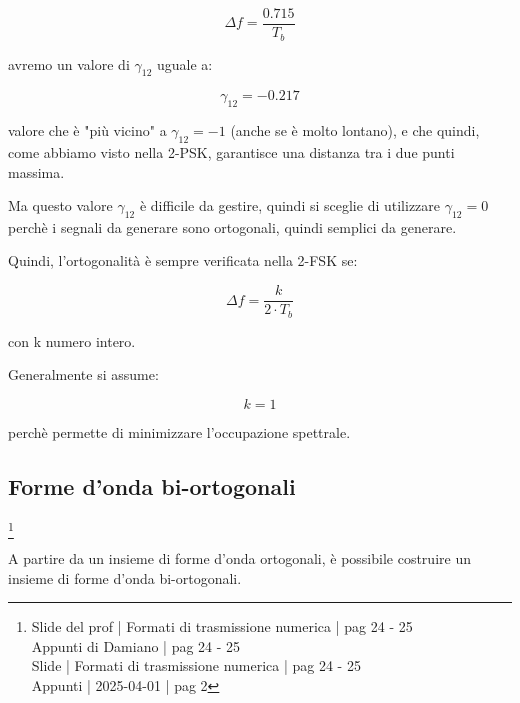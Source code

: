 {
    \Large 
    \begin{equation}
        \Delta f = 
        \frac{0.715}{T_b} 
    \end{equation}
}

avremo un valore di $\gamma_{12}$ uguale a: 

{
    \Large 
    \begin{equation}
        \gamma_{12} = -0.217
    \end{equation}
}

valore che è "più vicino" a $\gamma_{12} = -1$ (anche se è molto lontano), 
e che quindi, come abbiamo visto nella 2-PSK, garantisce una distanza tra i due punti massima. \newline 

Ma questo valore $\gamma_{12}$ è difficile da gestire, quindi si sceglie di utilizzare $\gamma_{12} = 0$ 
perchè i segnali da generare sono ortogonali, quindi semplici da generare. \newline 

Quindi, l'ortogonalità è sempre verificata nella 2-FSK se: 

{
    \Large 
    \begin{equation}
        \Delta f = \frac{k}{2 \cdot T_b}
    \end{equation}
}

con k numero intero. \newline 

Generalmente si assume: 

{
    \Large 
    \begin{equation}
        k = 1
    \end{equation}
}

perchè permette di minimizzare l'occupazione spettrale. \newline 

\newpage 

\subsection{Forme d'onda bi-ortogonali}
\footnote{Slide del prof | Formati di trasmissione numerica | pag 24 - 25\\  
Appunti di Damiano | pag 24 - 25\\
Slide | Formati di trasmissione numerica | pag  24 - 25\\
Appunti | 2025-04-01 | pag 2
}

A partire da un insieme di forme d'onda ortogonali, 
è possibile costruire un insieme di forme d'onda bi-ortogonali. \newline 

